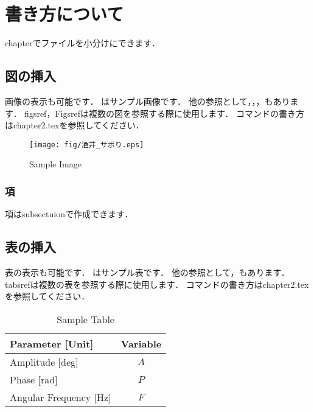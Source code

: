 \chapter{書き方について}
chapterでファイルを小分けにできます．

\section{図の挿入}
画像の表示も可能です．
はサンプル画像です．
他の参照として，，，もあります．
figsref，Figsrefは複数の図を参照する際に使用します．
コマンドの書き方はchapter2.texを参照してください．
\begin{figure}[h]
  \centering
  \texttt{[image: fig/酒井\_サボり.eps]}
  \vspace{-5pt}
  \caption{Sample Image}
  \label{fig:sample}
  \end{figure}

\subsection{項}
項はsubsectuionで作成できます．

\newpage

\section{表の挿入}
表の表示も可能です．
はサンプル表です．
他の参照として，もあります．
tabsrefは複数の表を参照する際に使用します．
コマンドの書き方はchapter2.texを参照してください．

\begin{table}[htbp]
  \begin{center}
   \caption{Sample Table}
   \label{tab:sample}
   \begin{tabular}{l|c} \hline\hline %
    Parameter [Unit]&Variable \\ \hline %
    Amplitude [deg] &$A$\\
    Phase [rad]&$P$\\
    Angular Frequency [Hz]& $F$\\\hline
   \end{tabular}
  \end{center}
 \end{table}